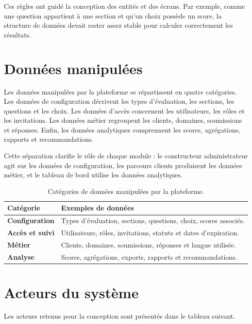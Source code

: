 \documentclass[12pt,a4paper]{report}
\begin{document}
Ces règles ont guidé la conception des entités et des écrans. Par exemple, comme une question appartient à une section et qu'un choix possède un score, la structure de données devait rester assez stable pour calculer correctement les résultats.

\section{Données manipulées}
Les données manipulées par la plateforme se répartissent en quatre catégories. Les données de configuration décrivent les types d'évaluation, les sections, les questions et les choix. Les données d'accès concernent les utilisateurs, les rôles et les invitations. Les données métier regroupent les clients, domaines, soumissions et réponses. Enfin, les données analytiques comprennent les scores, agrégations, rapports et recommandations.

Cette séparation clarifie le rôle de chaque module : le constructeur administrateur agit sur les données de configuration, les parcours clients produisent les données métier, et le tableau de bord utilise les données analytiques.

\begin{table}[H]
\centering
\caption{Catégories de données manipulées par la plateforme.}
\begin{tabularx}{\textwidth}{>{\bfseries}L{3.8cm}Y}
\toprule
Catégorie & Exemples de données \\
\midrule
Configuration & Types d'évaluation, sections, questions, choix, scores associés. \\
Accès et suivi & Utilisateurs, rôles, invitations, statuts et dates d'expiration. \\
Métier & Clients, domaines, soumissions, réponses et langue utilisée. \\
Analyse & Scores, agrégations, exports, rapports et recommandations. \\
\bottomrule
\end{tabularx}
\end{table}

\section{Acteurs du système}
Les acteurs retenus pour la conception sont présentés dans le tableau suivant.
\end{document}
